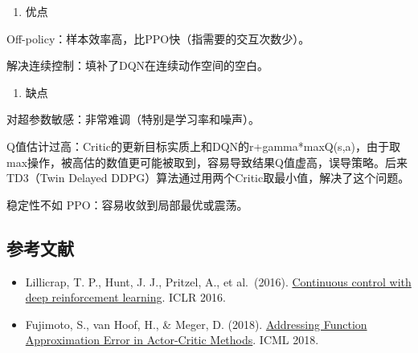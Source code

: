 \begin{enumerate}
\def\labelenumi{\arabic{enumi}.}
\tightlist
\item
  优点
\end{enumerate}

Off-policy：样本效率高，比PPO快（指需要的交互次数少）。

解决连续控制：填补了DQN在连续动作空间的空白。

\begin{enumerate}
\def\labelenumi{\arabic{enumi}.}
\setcounter{enumi}{1}
\tightlist
\item
  缺点
\end{enumerate}

对超参数敏感：非常难调（特别是学习率和噪声）。

Q值估计过高：Critic的更新目标实质上和DQN的r+gamma*maxQ(s,a)，由于取max操作，被高估的数值更可能被取到，容易导致结果Q值虚高，误导策略。后来TD3（Twin Delayed DDPG）算法通过用两个Critic取最小值，解决了这个问题。

稳定性不如 PPO：容易收敛到局部最优或震荡。

\FloatBarrier
{}
\hypertarget{ux53c2ux8003ux6587ux732e-60}{%
\subsection{参考文献}\label{ux53c2ux8003ux6587ux732e-60}}

\vspace{0.25em}
\begin{itemize}
\tightlist
\item
  Lillicrap, T. P., Hunt, J. J., Pritzel, A., et al.~(2016). \href{https://arxiv.org/abs/1509.02971}{Continuous control with deep reinforcement learning}. ICLR 2016.
\item
  Fujimoto, S., van Hoof, H., \& Meger, D. (2018). \href{https://proceedings.mlr.press/v80/fujimoto18a.html}{Addressing Function Approximation Error in Actor-Critic Methods}. ICML 2018.
\end{itemize}

\clearpage
